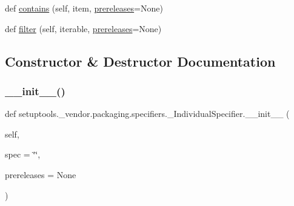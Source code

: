 \begin{DoxyCompactItemize}
\item 
def \hyperlink{classsetuptools_1_1__vendor_1_1packaging_1_1specifiers_1_1__IndividualSpecifier_add310771a2fd25ae2670e7ed15c81160}{contains} (self, item, \hyperlink{classsetuptools_1_1__vendor_1_1packaging_1_1specifiers_1_1__IndividualSpecifier_a6d34f246410481ecb8ec832ff59c581e}{prereleases}=None)
\item 
def \hyperlink{classsetuptools_1_1__vendor_1_1packaging_1_1specifiers_1_1__IndividualSpecifier_af07e3f018647cb7a004791b6436993e1}{filter} (self, iterable, \hyperlink{classsetuptools_1_1__vendor_1_1packaging_1_1specifiers_1_1__IndividualSpecifier_a6d34f246410481ecb8ec832ff59c581e}{prereleases}=None)
\end{DoxyCompactItemize}


\subsection{Constructor \& Destructor Documentation}
\mbox{\label{classsetuptools_1_1__vendor_1_1packaging_1_1specifiers_1_1__IndividualSpecifier_a25c110f9ca027a723ffd767b24894c0b}} 
\subsubsection{\texorpdfstring{\+\_\+\+\_\+init\+\_\+\+\_\+()}{\_\_init\_\_()}}
{\footnotesize\ttfamily def setuptools.\+\_\+vendor.\+packaging.\+specifiers.\+\_\+\+Individual\+Specifier.\+\_\+\+\_\+init\+\_\+\+\_\+ (\begin{DoxyParamCaption}\item[{}]{self,  }\item[{}]{spec = {\ttfamily \char`\"{}\char`\"{}},  }\item[{}]{prereleases = {\ttfamily None} }\end{DoxyParamCaption})}



